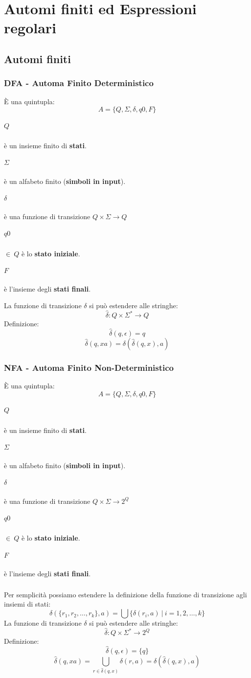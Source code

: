 \documentclass[12pt]{extarticle}
\begin{document}
\section{Automi finiti ed Espressioni regolari}
\subsection{Automi finiti}
\subsubsection{DFA - Automa Finito Deterministico}
È una quintupla:
\begin{equation*}
    A=\{Q,\Sigma,\delta,q0,F\}
\end{equation*}
\subparagraph*{$Q$} è un insieme finito di \textbf{stati}.
\subparagraph*{$\Sigma$} è un alfabeto finito (\textbf{simboli in input}).
\subparagraph*{$\delta$} è una funzione di transizione $Q\times\Sigma\rightarrow Q$
\subparagraph*{$q0$} $\in\ Q$ è lo \textbf{stato iniziale}.
\subparagraph*{$F$} è l'insieme degli \textbf{stati finali}.

La funzione di transizione $\delta$ si può estendere alle stringhe:
\begin{equation*}
    \hat{\delta}:Q\times\Sigma^*\rightarrow Q
\end{equation*}
Definizione:
\begin{equation*}
    \hat{\delta}(q,\epsilon)=q
\end{equation*}
\begin{equation*}
    \hat{\delta}(q,xa)=\delta(\hat{\delta}(q,x),a)  
\end{equation*}
\subsubsection{NFA - Automa Finito Non-Deterministico}
È una quintupla:
\begin{equation*}
    A=\{Q,\Sigma,\delta,q0,F\}
\end{equation*}
\subparagraph*{$Q$} è un insieme finito di \textbf{stati}.
\subparagraph*{$\Sigma$} è un alfabeto finito (\textbf{simboli in input}).
\subparagraph*{$\delta$} è una funzione di transizione $Q\times\Sigma\rightarrow 2^Q$
\subparagraph*{$q0$} $\in\ Q$ è lo \textbf{stato iniziale}.
\subparagraph*{$F$} è l'insieme degli \textbf{stati finali}.
\subparagraph*{}
Per semplicità possiamo estendere la definizione della funzione di transizione
agli insiemi di stati:
\begin{equation*}
    \delta(\{r_1,r_2,\dots,r_k\},a)=\bigcup\{\delta(r_i,a)\ |\ i=1,2,\dots,k\}
\end{equation*}
La funzione di transizione $\delta$ si può estendere alle stringhe:
\begin{equation*}
    \hat{\delta}:Q\times\Sigma^*\rightarrow 2^Q
\end{equation*}
Definizione:
\begin{equation*}
    \hat{\delta}(q,\epsilon)=\{q\}
\end{equation*}
\begin{equation*}
    \hat{\delta}(q,xa)=\bigcup_{r\in\hat{\delta}(q,x)}\delta(r,a)=\delta(\hat{\delta}(q,x),a)  
\end{equation*}
\end{document}
